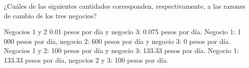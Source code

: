 ¿Cuáles de las siguientes cantidades corresponden, respectivamente, a las razones de cambio de los tres negocios?


\begin{choices}
    \choice Negocios 1 y 2 0.01 pesos por día y negocio 3: 0.075 pesos por día.
    \choice Negocio 1: 1 000 pesos por día, negocio 2: 600 pesos por día y negocio 3: 0 pesos por día.
    \CorrectChoice Negocios 1 y 2: 100 pesos por día y negocio 3: 133.33 pesos por día.
    \choice Negocio 1: 133.33 pesos por día, negocios 2 y 3: 100 pesos por día.
\end{choices}
